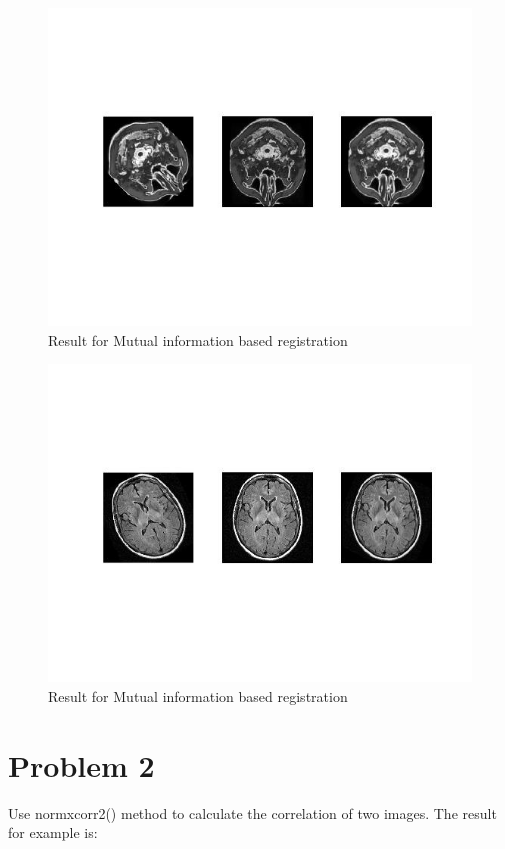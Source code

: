\documentclass[paper=a4, fontsize=11pt]{scrartcl} %
\numberwithin{equation}{section} %
\numberwithin{figure}{section} %
\numberwithin{table}{subsection} %
\begin{document}
	\begin{figure}[!htbp]
		\centering
		\includegraphics[width = 12cm]{p1.jpg}
		\caption{Result for Mutual information based registration}
	\end{figure}
	\begin{figure}[!htbp]
		\centering
		\includegraphics[width = 12cm]{p2.jpg}
		\caption{Result for Mutual information based registration}
	\end{figure}
	
	
	
	\newpage
	
	\section{Problem 2}
	
	Use normxcorr2() method to calculate the correlation of two images.
	The result for example is:
	
\end{document}

